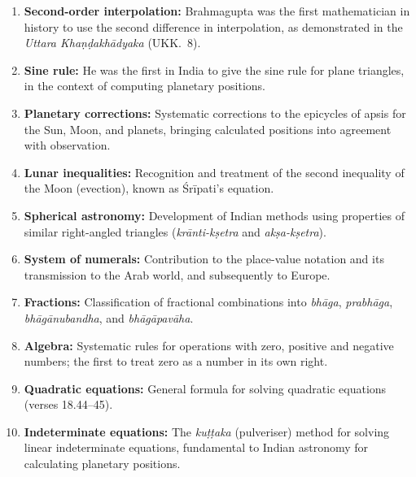 \documentclass[11pt,a4paper]{article}
\begin{document}
\begin{enumerate}[label=\textbf{\arabic*.}]
\item \textbf{Second-order interpolation:} Brahmagupta was the first mathematician in history to use the second difference in interpolation, as demonstrated in the \textit{Uttara Khaṇḍakhādyaka} (UKK.\ 8).

\item \textbf{Sine rule:} He was the first in India to give the sine rule for plane triangles, in the context of computing planetary positions.

\item \textbf{Planetary corrections:} Systematic corrections to the epicycles of apsis for the Sun, Moon, and planets, bringing calculated positions into agreement with observation.

\item \textbf{Lunar inequalities:} Recognition and treatment of the second inequality of the Moon (evection), known as Śrīpati's equation.

\item \textbf{Spherical astronomy:} Development of Indian methods using properties of similar right-angled triangles (\textit{krānti-kṣetra} and \textit{akṣa-kṣetra}).

\item \textbf{System of numerals:} Contribution to the place-value notation and its transmission to the Arab world, and subsequently to Europe.

\item \textbf{Fractions:} Classification of fractional combinations into \textit{bhāga}, \textit{prabhāga}, \textit{bhāgānubandha}, and \textit{bhāgāpavāha}.

\item \textbf{Algebra:} Systematic rules for operations with zero, positive and negative numbers; the first to treat zero as a number in its own right.

\item \textbf{Quadratic equations:} General formula for solving quadratic equations (verses 18.44--45).

\item \textbf{Indeterminate equations:} The \textit{kuṭṭaka} (pulveriser) method for solving linear indeterminate equations, fundamental to Indian astronomy for calculating planetary positions.
\end{enumerate}

\end{document}
